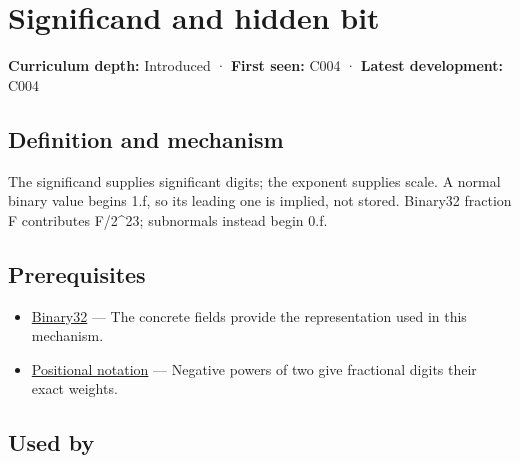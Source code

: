 \hypertarget{appendix-a24fd710cf67}{}\label{referencestart:appendix-a24fd710cf67}
\section{Significand and hidden bit}\label{appendix-a24fd710cf67-significand-and-hidden-bit}

\hypertarget{appendix-a24fd710cf67-significand-and-hidden-bit}{}

\textbf{Curriculum depth:} Introduced · \textbf{First seen:} C004 · \textbf{Latest development:} C004

\begin{allmightroledefinition}

\subsection{Definition and mechanism}\label{appendix-a24fd710cf67-definition-and-mechanism}

\hypertarget{appendix-a24fd710cf67-definition-and-mechanism}{}

The significand supplies significant digits; the exponent supplies scale. A normal binary value begins 1.f, so its leading one is implied, not stored. Binary32 fraction F contributes F/2\^{}23; subnormals instead begin 0.f.

\end{allmightroledefinition}

\subsection{Prerequisites}\label{appendix-a24fd710cf67-prerequisites}

\hypertarget{appendix-a24fd710cf67-prerequisites}{}

\begin{itemize}
\tightlist
\item
  \hyperref[appendix-5057f9ad327f]{Binary32} --- The concrete fields provide the representation used in this mechanism.
\item
  \hyperref[appendix-83c3f28f7bda]{Positional notation} --- Negative powers of two give fractional digits their exact weights.
\end{itemize}

\subsection{Used by}\label{appendix-a24fd710cf67-used-by}

